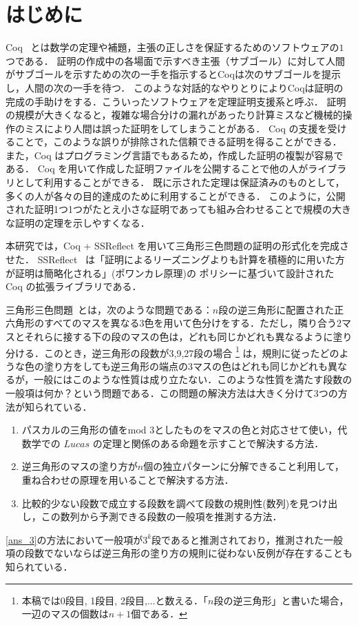 \section{はじめに}
Coq~\cite{Coq} とは数学の定理や補題，主張の正しさを保証するためのソフトウェアの$1$つである．
証明の作成中の各場面で示すべき主張（サブゴール）に対して人間がサブゴールを示すための次の一手を指示するとCoqは次のサブゴールを提示し，人間の次の一手を待つ．
このような対話的なやりとりによりCoqは証明の完成の手助けをする．こういったソフトウェアを定理証明支援系と呼ぶ．
証明の規模が大きくなると，複雑な場合分けの漏れがあったり計算ミスなど機械的操作のミスにより人間は誤った証明をしてしまうことがある．
Coq の支援を受けることで，このような誤りが排除された信頼できる証明を得ることができる．
また，Coq はプログラミング言語でもあるため，作成した証明の複製が容易である．
Coq を用いて作成した証明ファイルを公開することで他の人がライブラリとして利用することができる．
既に示された定理は保証済みのものとして，多くの人が各々の目的達成のために利用することができる．
このように，公開された証明1つ1つがたとえ小さな証明であっても組み合わせることで規模の大きな証明の定理を示しやすくなる．

本研究では，Coq + SSReflect を用いて三角形三色問題の証明の形式化を完成させた．
SSReflect~\cite{SSReflect,CoqBook} は「証明によるリーズニングよりも計算を積極的に用いた方が証明は簡略化される」(ポワンカレ原理)の
ポリシーに基づいて設計された Coq の拡張ライブラリである．

三角形三色問題~\cite{Nishiyama1,Nishiyama2,Nishiyama3}とは，次のような問題である：$n$段の逆三角形に配置された正六角形のすべてのマスを異なる3色を用いて色分けをする．ただし，隣り合う2マスとそれらに接する下の段のマスの色は，どれも同じかどれも異なるように塗り分ける．このとき，逆三角形の段数が3,9,27段の場合 \footnote{本稿では0段目, 1段目, 2段目,$\ldots$と数える．「$n$段の逆三角形」と書いた場合，一辺のマスの個数は$n+1$個である．} は，規則に従ったどのような色の塗り方をしても逆三角形の端点の3マスの色はどれも同じかどれも異なるが，一般にはこのような性質は成り立たない．このような性質を満たす段数の一般項は何か？という問題である．この問題の解決方法は大きく分けて3つの方法が知られている．\cite{Nishiyama1}
\begin{enumerate}
\item \label{ans_1}
  パスカルの三角形の値をmod $3$としたものをマスの色と対応させて使い，代数学での $Lucas$ の定理と関係のある命題を示すことで解決する方法．
\item \label{ans_2}
  逆三角形のマスの塗り方が$n$個の独立パターンに分解できること利用して，重ね合わせの原理を用いることで解決する方法．
\item \label{ans_3}
  比較的少ない段数で成立する段数を調べて段数の規則性(数列)を見つけ出し，この数列から予測できる段数の一般項を推測する方法．
\end{enumerate}
\ref{ans_3}の方法において一般項が$3^k$段であると推測されており，推測された一般項の段数でないならば逆三角形の塗り方の規則に従わない反例が存在することも知られている．

